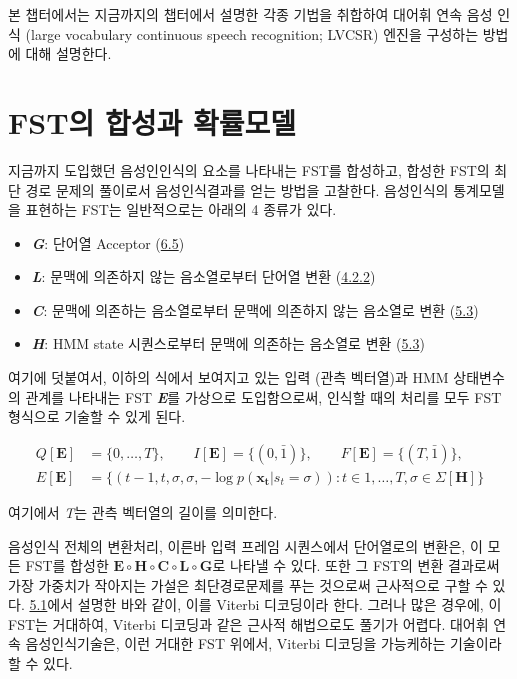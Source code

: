 \documentclass[../main.tex]{subfiles}
\begin{document}
\noindent
본 챕터에서는 지금까지의 챕터에서 설명한 각종 기법을 취합하여 대어휘 연속 음성 인식 (large vocabulary continuous speech recognition; LVCSR) 엔진을 구성하는 방법에 대해 설명한다. 

\section{FST의 합성과 확률모델}
지금까지 도입했던 음성인인식의 요소를 나타내는 FST를 합성하고, 합성한 FST의 최단 경로 문제의 풀이로서 음성인식결과를 얻는 방법을 고찰한다. 음성인식의 통계모델을 표현하는 FST는 일반적으로는 아래의 4 종류가 있다. 

\begin{itemize}
    \item \textbf{\textit{G}}: 단어열 Acceptor (\hyperref[sec:N-gram-FST]{6.5})
    \item \textbf{\textit{L}}: 문맥에 의존하지 않는 음소열로부터 단어열 변환 (\hyperref[subsec:pronunciation-model]{4.2.2})
    \item \textbf{\textit{C}}: 문맥에 의존하는 음소열로부터 문맥에 의존하지 않는 음소열로 변환 (\hyperref[sec:context-dependant-model]{5.3})
    \item \textbf{\textit{H}}: HMM state 시퀀스로부터 문맥에 의존하는 음소열로 변환 (\hyperref[sec:context-dependant-model]{5.3})
\end{itemize}
여기에 덧붙여서, 이하의 식에서 보여지고 있는 입력 (관측 벡터열)과 HMM 상태변수의 관계를 나타내는 FST \textbf{\textit{E}}를 가상으로 도입함으로써, 인식할 때의 처리를 모두 FST 형식으로 기술할 수 있게 된다. 

\begin{equation}\label{eq:7-1}
    \begin{split}
    Q[\bm{E}] &= \{0,\ldots,T\}, \qquad I[\bm{E}] = \{(0,\bar{1})\}, \qquad F[\bm{E}] = \{(T,\bar{1})\}, \\
    E[\bm{E}] &= \{(t-1, t, \sigma, \sigma, -\log p(\mathbf{x_t} | s_t = \sigma)): t \in {1, \ldots, T}, \sigma \in \Sigma[\bm{H}] \}
    \end{split}
\end{equation}

여기에서 \textit{T}는 관측 벡터열의 길이를 의미한다. 

음성인식 전체의 변환처리, 이른바 입력 프레임 시퀀스에서 단어열로의 변환은, 이 모든 FST를 합성한 $\bm{E} \circ \bm{H} \circ \bm{C} \circ \bm{L} \circ \bm{G}$로 나타낼 수 있다.
또한 그 FST의 변환 결과로써 가장 가중치가 작아지는 가설은 최단경로문제를 푸는 것으로써 근사적으로 구할 수 있다.
\hyperref[sec:HMM]{5.1}에서 설명한 바와 같이, 이를 Viterbi 디코딩이라 한다. 
그러나 많은 경우에, 이 FST는 거대하여, Viterbi 디코딩과 같은 근사적 해법으로도 풀기가 어렵다. 
대어휘 연속 음성인식기술은, 이런 거대한 FST 위에서, Viterbi 디코딩을 가능케하는 기술이라 할 수 있다. 
\end{document}
